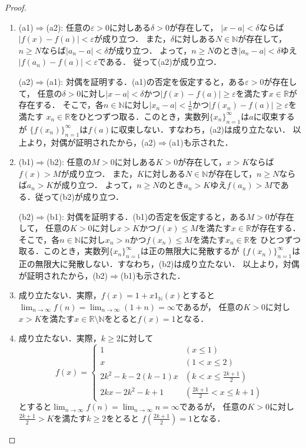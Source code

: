 \documentclass{jsarticle}
\theoremstyle{definition}
\begin{document}
\begin{proof}
\begin{enumerate}
\item
(a1)$\Rightarrow$(a2):
任意の$\varepsilon>0$に対しある$\delta>0$が存在して，
$|x-a|<\delta$ならば$|f(x)-f(a)|<\varepsilon$が成り立つ．
また，$\delta$に対しある$N\in\mathbb{N}$が存在して，$n\geq N$ならば$|a_n-a|<\delta$が成り立つ．
よって，$n\geq N$のとき$|a_n-a|<\delta$ゆえ$|f(a_n)-f(a)|<\varepsilon$である．
従って(a2)が成り立つ．

(a2)$\Rightarrow$(a1):
対偶を証明する．(a1)の否定を仮定すると，ある$\varepsilon>0$が存在して，
任意の$\delta>0$に対し$|x-a|<\delta$かつ$|f(x)-f(a)|\geq\varepsilon$を満たす$x\in\mathbb{R}$が存在する．
そこで，各$n\in\mathbb{N}$に対し$|x_n-a|<\frac{1}{n}$かつ$|f(x_n)-f(a)|\geq\varepsilon$を満たす
$x_n\in\mathbb{R}$をひとつずつ取る．このとき，実数列$\{x_n\}_{n=1}^\infty$は$a$に収束するが
$\{f(x_n)\}_{n=1}^\infty$は$f(a)$に収束しない．すなわち，(a2)は成り立たない．
以上より，対偶が証明されたから，(a2)$\Rightarrow$(a1)も示された．

\item
(b1)$\Rightarrow$(b2):
任意の$M>0$に対しある$K>0$が存在して，$x>K$ならば$f(x)>M$が成り立つ．
また，$K$に対しある$N\in\mathbb{N}$が存在して，$n\geq N$ならば$a_n>K$が成り立つ．
よって，$n\geq N$のとき$a_n>K$ゆえ$f(a_n)>M$である．従って(b2)が成り立つ．

(b2)$\Rightarrow$(b1):
対偶を証明する．(b1)の否定を仮定すると，ある$M>0$が存在して，
任意の$K>0$に対し$x>K$かつ$f(x)\leq M$を満たす$x\in\mathbb{R}$が存在する．
そこで，各$n\in\mathbb{N}$に対し$x_n>n$かつ$f(x_n)\leq M$を満たす$x_n\in\mathbb{R}$を
ひとつずつ取る．このとき，実数列$\{x_n\}_{n=1}^\infty$は正の無限大に発散するが
$\{f(x_n)\}_{n=1}^\infty$は正の無限大に発散しない．すなわち，(b2)は成り立たない．
以上より，対偶が証明されたから，(b2)$\Rightarrow$(b1)も示された．
\item
成り立たない．実際，$f(x)=1+x1_\mathbb{N}(x)$とすると
$\lim_{n\to\infty}f(n)=\lim_{n\to\infty}(1+n)=\infty$であるが，
任意の$K>0$に対し$x>K$を満たす$x\in\mathbb{R}\setminus\mathbb{N}$をとると$f(x)=1$となる．
\item
成り立たない．実際，$k\geq2$に対して
\[
f(x)=
\begin{cases}
1 & (x\leq1) \\
x & (1<x\leq2) \\
2k^2-k-2(k-1)x & (k<x\leq\frac{2k+1}{2}) \\
2kx-2k^2-k+1 & (\frac{2k+1}{2}<x\leq k+1)
\end{cases}
\]
とすると$\lim_{n\to\infty}f(n)=\lim_{n\to\infty}n=\infty$であるが，
任意の$K>0$に対し$\frac{2k+1}{2}>K$を満たす$k\geq2$をとると
$f(\frac{2k+1}{2})=1$となる．
\end{enumerate}
\end{proof}
\end{document}

